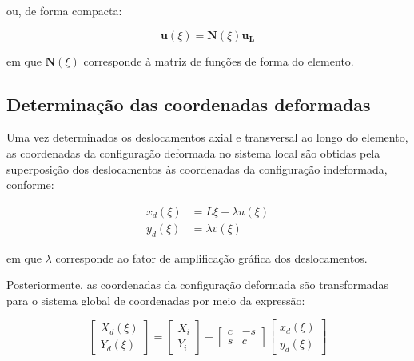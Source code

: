ou, de forma compacta:

\begin{equation}
    \mathbf{u}(\xi) =
    \mathbf{N}(\xi)\mathbf{u_L}
    \label{eq:deformada_interpolacao_compacta}
\end{equation}

em que $\mathbf{N}(\xi)$ corresponde à matriz de
funções de forma do elemento.

\subsection{Determinação das coordenadas deformadas}

Uma vez determinados os deslocamentos axial e transversal ao longo do elemento, as coordenadas da configuração deformada no sistema local são obtidas pela superposição dos deslocamentos às coordenadas da configuração indeformada, conforme:

\begin{equation}
    \begin{aligned}
        x_d(\xi) &= L\xi+\lambda u(\xi) \\
        y_d(\xi) &= \lambda v(\xi)
    \end{aligned}
    \label{eq:deformada_coordenadas_locais}
\end{equation}

em que $\lambda$ corresponde ao fator de amplificação gráfica dos deslocamentos.

Posteriormente, as coordenadas da configuração deformada são transformadas para o sistema global de coordenadas por meio da expressão:

\begin{equation}
    \begin{bmatrix}
        X_d(\xi) \\
        Y_d(\xi)
    \end{bmatrix}
    =
    \begin{bmatrix}
        X_i \\
        Y_i
    \end{bmatrix}
    +
    \begin{bmatrix}
        c & -s \\
        s &  c
    \end{bmatrix}
    \begin{bmatrix}
        x_d(\xi) \\
        y_d(\xi)
    \end{bmatrix}
    \label{eq:deformada_coordenadas_globais}
\end{equation}

